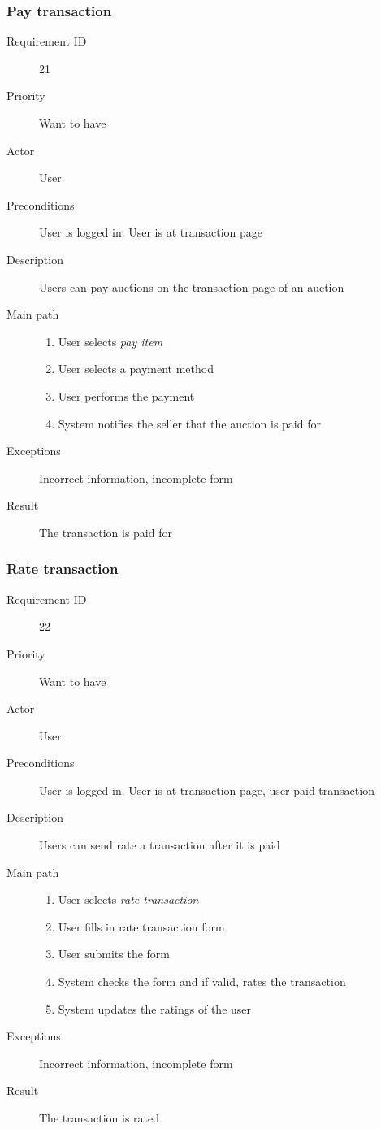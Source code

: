 		\subsubsection{Pay transaction}
			\begin{description}
				\item[Requirement ID] 21
				\item[Priority] Want to have
				\item[Actor] User
				\item[Preconditions] User is logged in. User is at transaction page
				\item[Description] Users can pay auctions on the transaction page of an auction
				\item[Main path]
 					\begin{enumerate}
						\item User selects \emph{pay item}
						\item User selects a payment method
						\item User performs the payment
						\item System notifies the seller that the auction is paid for
					\end{enumerate}
				\item[Exceptions] Incorrect information, incomplete form
				\item[Result] The transaction is paid for
			\end{description}
		\subsubsection{Rate transaction}
			\begin{description}
				\item[Requirement ID] 22
				\item[Priority] Want to have
				\item[Actor] User
				\item[Preconditions] User is logged in. User is at transaction page, user paid transaction
				\item[Description] Users can send rate a transaction after it is paid
				\item[Main path]
 					\begin{enumerate}
						\item User selects \emph{rate transaction}
						\item User fills in rate transaction form
						\item User submits the form
						\item System checks the form and if valid, rates the transaction
						\item System updates the ratings of the user
					\end{enumerate}
				\item[Exceptions] Incorrect information, incomplete form
				\item[Result] The transaction is rated
			\end{description}
